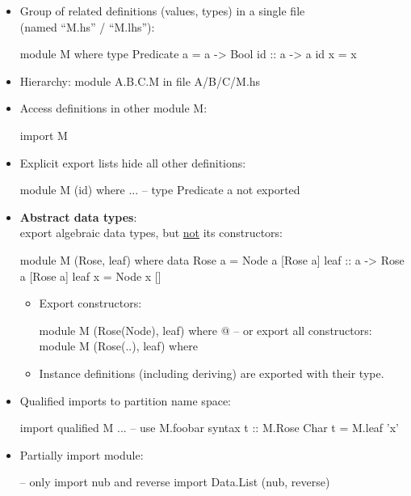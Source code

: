\begin{itemize}
    \item Group of related definitions (values, types) in a single file \\ (named ``M.hs'' / ``M.lhs''):
    \begin{codebox}[haskell]
module M where
    type Predicate a = a -> Bool
    id :: a -> a
    id x = x
    \end{codebox}
    \item Hierarchy: module A.B.C.M in file A/B/C/M.hs
    \item Access definitions in other module M:
    \begin{codebox}[haskell]
import M
    \end{codebox}

    \newpage
    \item Explicit export lists hide all other definitions:
    \begin{codebox}[haskell]
module M (id) where
    ...
    -- type Predicate a not exported
    \end{codebox}
    \item \textbf{Abstract data types}:\\
    export algebraic data types, but \underline{not} its constructors:
        \begin{codebox}[haskell]
module M (Rose, leaf) where
    data Rose a = Node a [Rose a]
    leaf :: a -> Rose a [Rose a]
    leaf x = Node x []
        \end{codebox}
    \begin{itemize}
        \item Export constructors:
        \begin{codebox}[haskell]
module M (Rose(Node), leaf) where
    @\dots@
-- or export all constructors:
module M (Rose(..), leaf) where
        \end{codebox}
        \item Instance definitions (including deriving) are exported with their type.
    \end{itemize}
    \item Qualified imports to partition name space:
    \begin{codebox}[haskell]
import qualified M
    ...
    -- use M.foobar syntax
    t :: M.Rose Char
    t = M.leaf 'x'
    \end{codebox}
    \item Partially import module:
    \begin{codebox}[haskell]
-- only import nub and reverse
import Data.List (nub, reverse)


\end{codebox}
\end{itemize}

